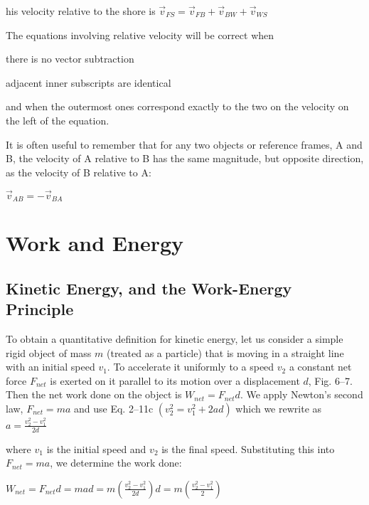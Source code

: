 \documentclass{extarticle}
\begin{document}
\begin{tcolorbox}[enhanced jigsaw,sharp corners,coltext=black,colback=BurntOrange!25!white,boxrule=0pt,breakable,size=minimal]
his velocity relative to the shore is $\vec{v}_{FS} = \vec{v}_{FB} + \vec{v}_{BW} + \vec{v}_{WS}$

The equations involving relative velocity will be correct when

there is no vector subtraction 

adjacent inner subscripts are identical

and when the outermost ones correspond exactly to the two on the velocity on the left of the equation.

It is often useful to remember that for any two objects or reference frames, A and B, the velocity of A relative to B has the same magnitude, but opposite direction, as the velocity of B relative to A:

$\vec{v}_{AB} = -\vec{v}_{BA}$


\end{tcolorbox}
















\section{Work and Energy}

\subsection{Kinetic Energy, and the Work-Energy Principle}

To obtain a quantitative definition for kinetic energy, let us consider a simple rigid object of mass $m$ (treated as a particle) that is moving in a straight line with an initial speed $v_1$. To accelerate it uniformly to a speed $v_2$ a constant net force $F_{net}$ is exerted on it parallel to its motion over a displacement $d$, Fig. 6–7. Then the net work done on the object is $W_{net} = F_{net}d$. We apply Newton’s second law, $F_{net} = ma$ and use Eq. 2–11c $(v_2^2 = v_1^2 + 2ad)$ which we rewrite as
$a = \frac{v_2^2 - v_1^2}{2d}$

where $v_1$ is the initial speed and $v_2$ is the final speed. Substituting this into $F_{net} = ma$, we determine the work done:

$W_{net} = F_{net}d = mad = m(\frac{v_2^2 - v_1^2}{2d})d = m(\frac{v_2^2 - v_1^2}{2})$
\end{document}
